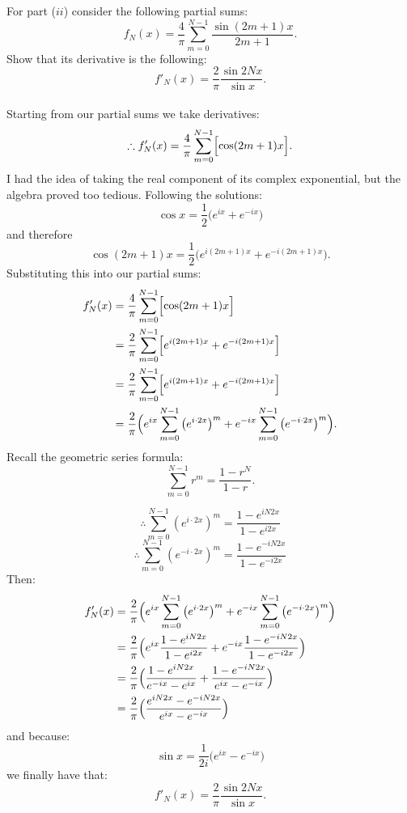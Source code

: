\begin{enumerate}
    \newpage

    For part ($ii$) consider the following partial sums:
    $$f_N(x)=\frac{4}{\pi}\sum_{m=0}^{N-1}\frac{\sin(2m+1)x}
    {2m+1}.$$
    Show that its derivative is the following:
    $$f'_N(x)=\frac{2}{\pi}\frac{\sin2Nx}{\sin x}.$$ \\

    Starting from our partial sums we take derivatives:
    $$\therefore f'_N(x)=\frac{4}{\pi}\sum_{m=0}^{N-1}
    \Bigl[\cos(2m+1)x\Bigr].$$
    I had the idea of taking the real component of its complex
    exponential, but the algebra proved too tedious. Following the solutions:
    $$\cos x=\frac{1}{2}\bigl(e^{ix}+e^{-ix}\bigr)$$
    and therefore
    $$\cos(2m+1)x=\frac{1}{2}\bigl(e^{i(2m+1)x}+e^{-i(2m+1)x}\bigr).$$
    Substituting this into our partial sums:
    \begin{align*}
        f'_N(x)
        &=\frac{4}{\pi}\sum_{m=0}^{N-1}
        \Bigl[\cos(2m+1)x\Bigr] \\
        &=\frac{2}{\pi}\sum_{m=0}^{N-1}
        \Bigl[e^{i(2m+1)x}+e^{-i(2m+1)x}\Bigr] \\
        &=\frac{2}{\pi}\sum_{m=0}^{N-1}
        \Bigl[e^{i(2m+1)x}+e^{-i(2m+1)x}\Bigr] \\
        &=\frac{2}{\pi}\Bigl(
            e^{ix}\sum_{m=0}^{N-1}\left(e^{i\cdot 2x}\right)^m
            +e^{-ix}\sum_{m=0}^{N-1}\left(e^{-i\cdot 2x}\right)^m
        \Bigr).
    \end{align*}
    Recall the geometric series formula:
    $$\sum_{m=0}^{N-1} r^m=\frac{1-r^N}{1-r}.$$

    \newpage
    $$\therefore\sum_{m=0}^{N-1}\left(e^{i\cdot 2x}\right)^m
    =\frac{1-e^{iN2x}}{1-e^{i2x}}$$
    $$\therefore\sum_{m=0}^{N-1}\left(e^{-i\cdot 2x}\right)^m
    =\frac{1-e^{-iN2x}}{1-e^{-i2x}}$$
    Then:
    \begin{align*}
        f'_N(x)
        &=\frac{2}{\pi}\Bigl(
            e^{ix}\sum_{m=0}^{N-1}\left(e^{i\cdot 2x}\right)^m
            +e^{-ix}\sum_{m=0}^{N-1}\left(e^{-i\cdot 2x}\right)^m
        \Bigr) \\
        &=\frac{2}{\pi}\Bigl(
            e^{ix}\frac{1-e^{iN2x}}{1-e^{i2x}}
            +e^{-ix}\frac{1-e^{-iN2x}}{1-e^{-i2x}}
        \Bigr) \\
        &=\frac{2}{\pi}\Bigl(
            \frac{1-e^{iN2x}}{e^{-ix}-e^{ix}}
            +\frac{1-e^{-iN2x}}{e^{ix}-e^{-ix}}
        \Bigr) \\
        &=\frac{2}{\pi}\Bigl(
            \frac{e^{iN2x}-e^{-iN2x}}{e^{ix}-e^{-ix}}
        \Bigr)
    \end{align*}
    and because:
    $$\sin x=\frac{1}{2i}\bigl(e^{ix}-e^{-ix}\bigr)$$
    we finally have that:
    $$f'_N(x)=\frac{2}{\pi}\frac{\sin2Nx}{\sin x}.$$ \\


\end{enumerate}

